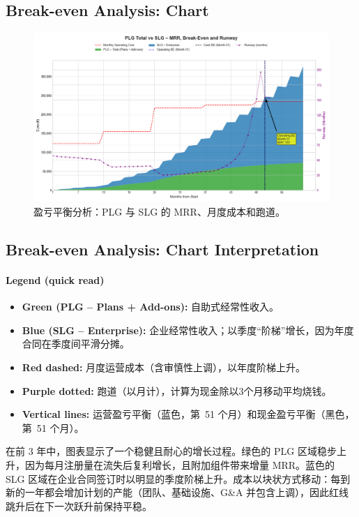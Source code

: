 \documentclass[11pt, a4paper, oneside]{article}
\begin{document}
\newpage
\subsection{Break-even Analysis: Chart}
\begin{figure}[H]
    \centering 
    \includegraphics[width=\textwidth]{financial_projection.png}
    \caption{盈亏平衡分析：PLG 与 SLG 的 MRR、月度成本和跑道。}
    \label{fig:break_even_analysis}
\end{figure} 
\subsection{Break-even Analysis: Chart Interpretation}

\paragraph{Legend (quick read)}
\begin{itemize}
  \item \textbf{Green (PLG -- Plans + Add-ons):} 自助式经常性收入。
  \item \textbf{Blue (SLG -- Enterprise):} 企业经常性收入；以季度``阶梯''增长，因为年度合同在季度间平滑分摊。
  \item \textbf{Red dashed:} 月度运营成本（含审慎性上调），以年度阶梯上升。
  \item \textbf{Purple dotted:} 跑道（以月计），计算为现金除以3个月移动平均烧钱。
  \item \textbf{Vertical lines:} 运营盈亏平衡（蓝色，第~51 个月）和现金盈亏平衡（黑色，第~51 个月）。
\end{itemize}

在前 3 年中，图表显示了一个稳健且耐心的增长过程。绿色的 PLG 区域稳步上升，因为每月注册量在流失后复利增长，且附加组件带来增量 MRR。蓝色的 SLG 区域在企业合同签订时以明显的季度阶梯上升。成本以块状方式移动：每到新的一年都会增加计划的产能（团队、基础设施、G\&A 并包含上调），因此红线跳升后在下一次跃升前保持平稳。
\end{document}
